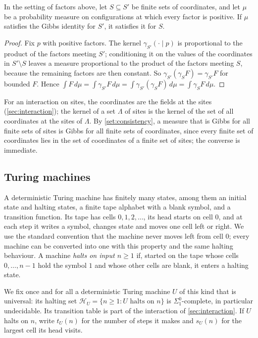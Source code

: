\begin{lemma}[Consistency]\label{set:consistency}
In the setting of factors above, let $S\subseteq S'$ be finite sets of coordinates, and let $\mu$ be a probability measure on configurations at which every factor is positive. If $\mu$ satisfies the Gibbs identity for $S'$, it satisfies it for $S$.
\end{lemma}

\begin{proof}
Fix $p$ with positive factors. The kernel $\gamma_{S'}(\cdot\mid p)$ is proportional to the product of the factors meeting $S'$; conditioning it on the values of the coordinates in $S'\setminus S$ leaves a measure proportional to the product of the factors meeting $S$, because the remaining factors are then constant. So $\gamma_{S'}(\gamma_S F)=\gamma_{S'}F$ for bounded $F$. Hence $\int F\,d\mu=\int\gamma_{S'}F\,d\mu=\int\gamma_{S'}(\gamma_SF)\,d\mu=\int\gamma_SF\,d\mu$.
\end{proof}

For an interaction on sites, the coordinates are the fields at the sites (\cref{sec:interaction}); the kernel of a set $\Lambda$ of sites is the kernel of the set of all coordinates at the sites of $\Lambda$. By \cref{set:consistency}, a measure that is Gibbs for all finite sets of sites is Gibbs for all finite sets of coordinates, since every finite set of coordinates lies in the set of coordinates of a finite set of sites; the converse is immediate.

\subsection{Turing machines}\label{set:sub-tm}

A deterministic Turing machine has finitely many states, among them an initial state and halting states, a finite tape alphabet with a blank symbol, and a transition function. Its tape has cells $0,1,2,\dots$, its head starts on cell $0$, and at each step it writes a symbol, changes state and moves one cell left or right. We use the standard convention that the machine never moves left from cell $0$; every machine can be converted into one with this property and the same halting behaviour. A machine \emph{halts on input $n\ge1$} if, started on the tape whose cells $0,\dots,n-1$ hold the symbol $1$ and whose other cells are blank, it enters a halting state.

We fix once and for all a deterministic Turing machine $U$ of this kind that is universal: its halting set $\mathcal H_U=\{n\ge1: U\text{ halts on }n\}$ is $\Sigma^0_1$-complete, in particular undecidable. Its transition table is part of the interaction of \cref{sec:interaction}. If $U$ halts on $n$, write $t_U(n)$ for the number of steps it makes and $s_U(n)$ for the largest cell its head visits.

